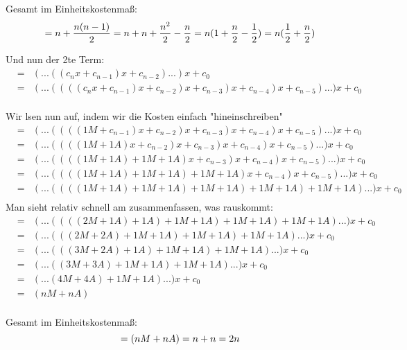 Gesamt im Einheitskostenma\ss:\\
\begin{equation*}
= n + \frac{n (n - 1)}{2} = n + n + \frac{n^2}{2} - \frac{n}{2} = n (1 + \frac{n}{2} - \frac{1}{2}) = n(\frac{1}{2}+ \frac{n}{2})\\
\end{equation*}

\newpage

Und nun der 2te Term:
\begin{eqnarray*}
&=& (... ((c_{n}x + c_{n - 1})x + c_{n - 2}) ...)x + c_0\\
&=& (... ((((c_{n}x + c_{n - 1})x + c_{n - 2})x + c_{n - 3})x + c_{n - 4})x + c_{n - 5}) ...)x + c_0\\
\end{eqnarray*}

Wir l\ouml sen nun auf, indem wir die Kosten einfach "hineinschreiben"
\begin{eqnarray*}
&=& (... ((((1M + c_{n - 1})x + c_{n - 2})x + c_{n - 3})x + c_{n - 4})x + c_{n - 5}) ...)x + c_0\\
&=& (... ((((1M + 1A)x + c_{n - 2})x + c_{n - 3})x + c_{n - 4})x + c_{n - 5}) ...)x + c_0\\
&=& (... ((((1M + 1A) + 1M + 1A)x + c_{n - 3})x + c_{n - 4})x + c_{n - 5}) ...)x + c_0\\
&=& (... ((((1M + 1A) + 1M + 1A) +1M + 1A)x + c_{n - 4})x + c_{n - 5}) ...)x + c_0\\
&=& (... ((((1M + 1A) + 1M + 1A) +1M + 1A) + 1M + 1A) +1M + 1A) ...)x + c_0\\
\end{eqnarray*}
Man sieht relativ schnell am zusammenfassen, was rauskommt:
\begin{eqnarray*}
&=& (... ((((2M + 1A) + 1A) +1M + 1A) + 1M + 1A) +1M + 1A) ...)x + c_0\\
&=& (... (((2M + 2A) +1M + 1A) + 1M + 1A) +1M + 1A) ...)x + c_0\\
&=& (... (((3M + 2A) + 1A) + 1M + 1A) +1M + 1A) ...)x + c_0\\
&=& (... ((3M + 3A) + 1M + 1A) +1M + 1A) ...)x + c_0\\
&=& (... (4M + 4A) +1M + 1A) ...)x + c_0\\
&=& (nM + nA)\\
\end{eqnarray*}


Gesamt im Einheitskostenma\ss:\\
\begin{equation*}
= (nM + nA) = n + n = 2n\\
\end{equation*}
  


